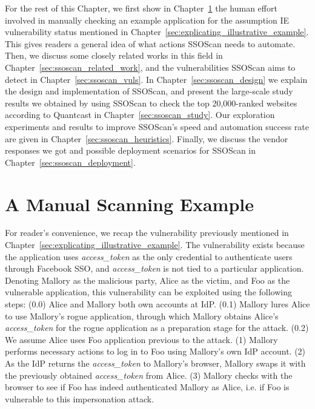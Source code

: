 For the rest of this Chapter, we first show in Chapter~\ref{sec:ssoscan_manual_example} the human effort involved in manually checking an example application for the assumption IE vulnerability status mentioned in Chapter~\ref{sec:explicating_illustrative_example}.  This gives readers a general idea of what actions SSOScan needs to automate.  Then, we discuss some closely related works in this field in Chapter~\ref{sec:ssoscan_related_work}, and the vulnerabilities SSOScan aims to detect in Chapter~\ref{sec:ssoscan_vuls}.  In Chapter~\ref{sec:ssoscan_design} we explain the design and implementation of SSOScan, and present the large-scale study results we obtained by using SSOScan to check the top 20,000-ranked websites according to Quantcast in Chapter~\ref{sec:ssoscan_study}.  Our exploration experiments and results to improve SSOScan's speed and automation success rate are given in Chapter~\ref{sec:ssoscan_heuristics}.  Finally, we discuss the vendor responses we got and possible deployment scenarios for SSOScan in Chapter~\ref{sec:ssoscan_deployment}.

\section{A Manual Scanning Example}
\label{sec:ssoscan_manual_example}

For reader's convenience, we recap the vulnerability previously mentioned in Chapter~\ref{sec:explicating_illustrative_example}.  The vulnerability exists because the application uses \emph{access\_token} as the only credential to authenticate users through Facebook SSO, and \emph{access\_token} is not tied to a particular application.  Denoting Mallory as the malicious party, Alice as the victim, and Foo as the vulnerable application, this vulnerability can be exploited using the following steps:  (0.0) Alice and Mallory both own accounts at IdP.  (0.1) Mallory lures Alice to use Mallory's rogue application, through which Mallory obtains Alice's \emph{access\_token} for the rogue application as a preparation stage for the attack.  (0.2) We assume Alice uses Foo application previous to the attack.  (1) Mallory performs necessary actions to log in to Foo using Mallory's own IdP account.  (2) As the IdP returns the \emph{access\_token} to Mallory's browser, Mallory swaps it with the previously obtained \emph{access\_token} from Alice.  (3) 
Mallory checks with the browser to see if Foo has indeed authenticated Mallory as Alice, i.e. if Foo is vulnerable to this impersonation attack.

